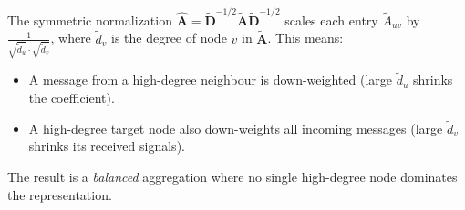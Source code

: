 The symmetric normalization $\hat{\mathbf{A}} = \tilde{\mathbf{D}}^{-1/2} \tilde{\mathbf{A}} \tilde{\mathbf{D}}^{-1/2}$ scales each entry $\tilde{A}_{uv}$ by $\frac{1}{\sqrt{\tilde{d}_u} \cdot \sqrt{\tilde{d}_v}}$, where $\tilde{d}_v$ is the degree of node $v$ in $\tilde{\mathbf{A}}$. This means:
\begin{itemize}[noitemsep]
    \item A message from a high-degree neighbour is down-weighted (large $\tilde{d}_u$ shrinks the coefficient).
    \item A high-degree target node also down-weights all incoming messages (large $\tilde{d}_v$ shrinks its received signals).
\end{itemize}
The result is a \emph{balanced} aggregation where no single high-degree node dominates the representation.

